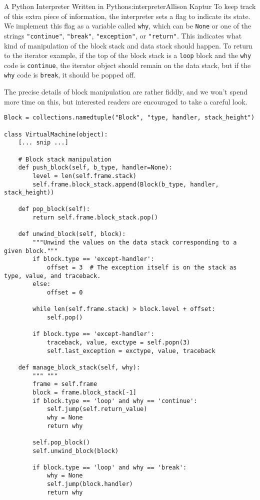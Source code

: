 \begin{aosachapter}{A Python Interpreter Written in Python}{s:interpreter}{Allison Kaptur}
To keep track of this extra piece of information, the interpreter sets a
flag to indicate its state. We implement this flag as a variable called
\texttt{why}, which can be \texttt{None} or one of the strings
\texttt{"continue"}, \texttt{"break"}, \texttt{"exception"}, or
\texttt{"return"}. This indicates what kind of manipulation of the block
stack and data stack should happen. To return to the iterator example,
if the top of the block stack is a \texttt{loop} block and the
\texttt{why} code is \texttt{continue}, the iterator object should
remain on the data stack, but if the \texttt{why} code is
\texttt{break}, it should be popped off.

The precise details of block manipulation are rather fiddly, and we
won't spend more time on this, but interested readers are encouraged to
take a careful look.

\begin{verbatim}
Block = collections.namedtuple("Block", "type, handler, stack_height")

class VirtualMachine(object):
    [... snip ...]

    # Block stack manipulation
    def push_block(self, b_type, handler=None):
        level = len(self.frame.stack)
        self.frame.block_stack.append(Block(b_type, handler, stack_height))

    def pop_block(self):
        return self.frame.block_stack.pop()

    def unwind_block(self, block):
        """Unwind the values on the data stack corresponding to a given block."""
        if block.type == 'except-handler':
            offset = 3  # The exception itself is on the stack as type, value, and traceback.
        else:
            offset = 0

        while len(self.frame.stack) > block.level + offset:
            self.pop()

        if block.type == 'except-handler':
            traceback, value, exctype = self.popn(3)
            self.last_exception = exctype, value, traceback

    def manage_block_stack(self, why):
        """ """
        frame = self.frame
        block = frame.block_stack[-1]
        if block.type == 'loop' and why == 'continue':
            self.jump(self.return_value)
            why = None
            return why

        self.pop_block()
        self.unwind_block(block)

        if block.type == 'loop' and why == 'break':
            why = None
            self.jump(block.handler)
            return why


\end{verbatim}
\end{aosachapter}
